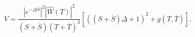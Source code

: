 \begin{equation}
V= \frac{|e^{-\Delta S}|^2 |\hat W(T)|^2}{(S + \bar S)(T+\bar T)^3}
[((S+\bar S)\Delta +1)^2 + g(T,\bar T)],
\end{equation}

